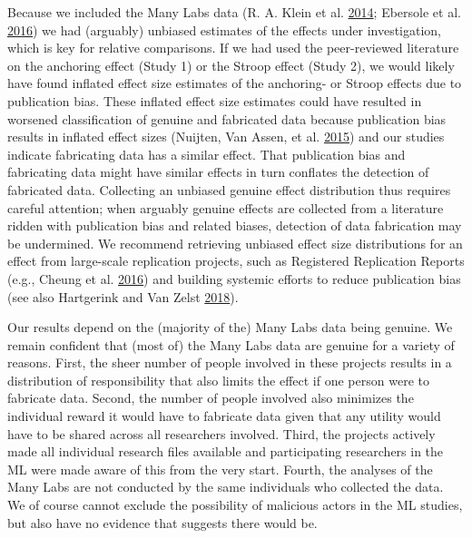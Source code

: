 \documentclass[a5paper]{book}
\begin{document}
Because we included the Many Labs data (R. A. Klein et al.
\protect\hyperlink{ref-doi:10.1027ux2f1864-9335ux2fa000178}{2014};
Ebersole et al.
\protect\hyperlink{ref-doi:10.1016ux2fj.jesp.2015.10.012}{2016}) we had
(arguably) unbiased estimates of the effects under investigation, which
is key for relative comparisons. If we had used the peer-reviewed
literature on the anchoring effect (Study 1) or the Stroop effect (Study
2), we would likely have found inflated effect size estimates of the
anchoring- or Stroop effects due to publication bias. These inflated
effect size estimates could have resulted in worsened classification of
genuine and fabricated data because publication bias results in inflated
effect sizes (Nuijten, Van Assen, et al.
\protect\hyperlink{ref-doi:10.1037ux2fgpr0000034}{2015}) and our studies
indicate fabricating data has a similar effect. That publication bias
and fabricating data might have similar effects in turn conflates the
detection of fabricated data. Collecting an unbiased genuine effect
distribution thus requires careful attention; when arguably genuine
effects are collected from a literature ridden with publication bias and
related biases, detection of data fabrication may be undermined. We
recommend retrieving unbiased effect size distributions for an effect
from large-scale replication projects, such as Registered Replication
Reports (e.g., Cheung et al.
\protect\hyperlink{ref-doi:10.1177ux2f1745691616664694}{2016}) and
building systemic efforts to reduce publication bias (see also
Hartgerink and Van Zelst
\protect\hyperlink{ref-doi:10.3390ux2fpublications6020021}{2018}).

Our results depend on the (majority of the) Many Labs data being
genuine. We remain confident that (most of) the Many Labs data are
genuine for a variety of reasons. First, the sheer number of people
involved in these projects results in a distribution of responsibility
that also limits the effect if one person were to fabricate data.
Second, the number of people involved also minimizes the individual
reward it would have to fabricate data given that any utility would have
to be shared across all researchers involved. Third, the projects
actively made all individual research files available and participating
researchers in the ML were made aware of this from the very start.
Fourth, the analyses of the Many Labs are not conducted by the same
individuals who collected the data. We of course cannot exclude the
possibility of malicious actors in the ML studies, but also have no
evidence that suggests there would be.
\end{document}
